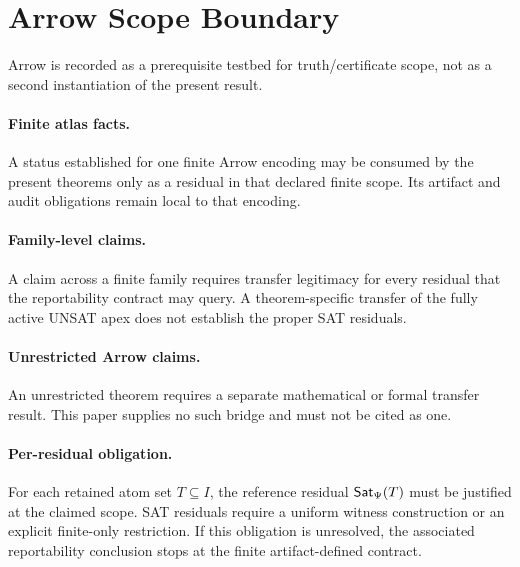 \section{Arrow Scope Boundary}
\label{app:arrow}

Arrow is recorded as a prerequisite testbed for truth/certificate scope, not as
a second instantiation of the present result.

\paragraph{Finite atlas facts.}
A status established for one finite Arrow encoding may be consumed by the present theorems only
as a residual in that declared finite scope.  Its artifact and audit obligations
remain local to that encoding.

\paragraph{Family-level claims.}
A claim across a finite family requires transfer legitimacy for every residual
that the reportability contract may query.  A theorem-specific transfer of the
fully active UNSAT apex does not establish the proper SAT residuals.

\paragraph{Unrestricted Arrow claims.}
An unrestricted theorem requires a separate mathematical or formal transfer
result.  This paper supplies no such bridge and must not be cited as one.

\paragraph{Per-residual obligation.}
For each retained atom set \(T\subseteq I\), the reference residual
\(\mathsf{Sat}_{\Psi}(T)\) must be justified at the claimed scope.  SAT residuals require a
uniform witness construction or an explicit finite-only restriction.  If this
obligation is unresolved, the associated reportability conclusion stops at the
finite artifact-defined contract.
